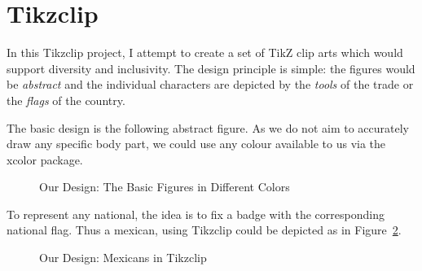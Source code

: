 \documentclass[a4paper]{article}
\begin{document}
\section{Tikzclip}
In this Tikzclip project, I attempt to create a set of TikZ clip arts which would support diversity and inclusivity. The design principle is simple: the figures would be \emph{abstract} and the individual characters are depicted by the \emph{tools} of the trade or the \emph{flags} of the country. 

The basic design is the following abstract figure. As we do not aim to accurately draw any specific body part, we could use any colour available to us via the xcolor package.

\begin{figure}[htb]
    \centering
     \caption{ Our Design: The Basic Figures in Different Colors}
    \label{fig:Tikzclip-basic}
   \end{figure}

To represent any national, the idea is to fix a badge with the corresponding national flag. Thus a mexican, using Tikzclip could be depicted as in Figure~\ref{fig:Tikzclip-mexican}.

\begin{figure}[htb]
    \centering
       \caption{ Our Design: Mexicans in Tikzclip}
    \label{fig:Tikzclip-mexican}
 
\end{figure}
\end{document}
